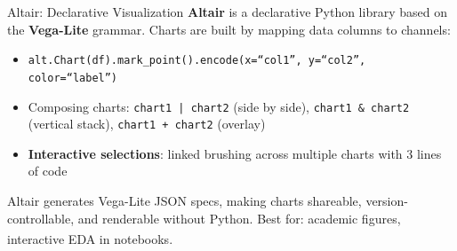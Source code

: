 \begin{v3topic}{Altair: Declarative Visualization}
    \textbf{Altair} is a declarative Python library based on the \textbf{Vega-Lite}
    grammar. Charts are built by mapping data columns to channels:
    \begin{itemize}
        \item \texttt{alt.Chart(df).mark\_point().encode(x=``col1'', y=``col2'',
              color=``label'')}
        \item Composing charts: \texttt{chart1 | chart2} (side by side),
              \texttt{chart1 \& chart2} (vertical stack), \texttt{chart1 + chart2}
              (overlay)
        \item \textbf{Interactive selections}: linked brushing across multiple charts with
              3 lines of code
    \end{itemize}
    Altair generates Vega-Lite JSON specs, making charts shareable, version-controllable,
    and renderable without Python. Best for: academic figures, interactive EDA in
    notebooks\textsuperscript{\cite[][pp.~50--120]{loducaDataStorytellingAltair2024}}.

\end{v3topic}
